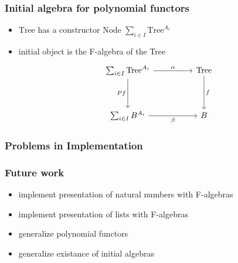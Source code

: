 \documentclass{beamer}
\begin{document}
\begin{frame}[fragile]
\frametitle{Initial algebra for polynomial functors}
\begin{itemize}
\item \(\text{Tree}\) has a constructor \(\text{Node } \sum_{i\in I}\text{Tree}^{A_i}\)
\item initial object is the F-algebra of the Tree
  \[\begin{tikzcd}
      {\sum_{i\in I}\text{Tree}^{A_i}} && {\text{Tree}} \\
      \\
      {\sum_{i \in I}B^{A_i}} && B
      \arrow["\alpha", from=1-1, to=1-3]
      \arrow["Pf"', from=1-1, to=3-1]
      \arrow["\beta"', from=3-1, to=3-3]
      \arrow["f", from=1-3, to=3-3]
    \end{tikzcd}\]
\end{itemize}

\end{frame}
\begin{frame}
\frametitle{Problems in Implementation}



\end{frame}
\begin{frame}
\frametitle{Future work}
\begin{itemize}
\item implement presentation of natural numbers with F-algebras
\item implement presentation of lists with F-algebras
\item generalize polynomial functors
\item generalize existance of initial algebras
\end{itemize}


\end{frame}




\end{document}
